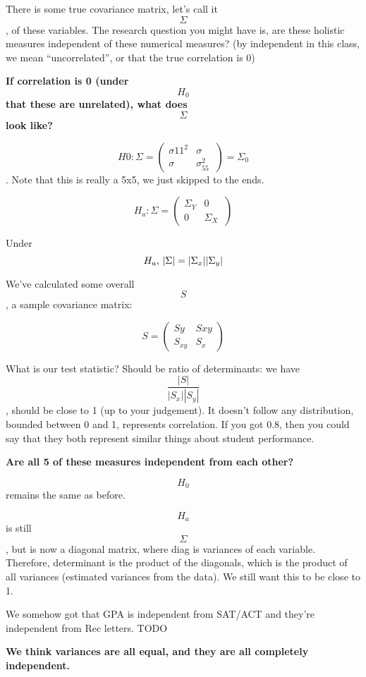 There is some true covariance matrix, let's call it \[\Sigma\], of these
variables. The research question you might have is, are these holistic
measures independent of these numerical measures? (by independent in
this class, we mean ``uncorrelated'', or that the true correlation is 0)

\textbf{If correlation is 0 (under} \[H_0\] \textbf{that these are
unrelated), what does} \[\Sigma\] \textbf{look like?}

\[H0: \Sigma = \left(\begin{array}{c} \sigma{11}^2 & \sigma \\ \sigma & \sigma_{55}^2 \ \end{array} \right) = \Sigma_0\].
Note that this is really a 5x5, we just skipped to the ends.

\[H_a: \Sigma = \left(\begin{array}{c} \Sigma_Y & 0 \\ 0 & \Sigma_X \ \end{array} \right)\]

Under \[H_a$, $| \Sigma | = | \Sigma_x | | \Sigma_y |\]

We've calculated some overall \[S\], a sample covariance matrix:

\[S = \left(\begin{array}{c} Sy & S{xy} \\ S_{xy} & S_x \ \end{array} \right)\]

What is our test statistic? Should be ratio of determinants: we have
\[\frac{| S |}{| S_x | |S_y|}\], should be close to 1 (up to your
judgement). It doesn't follow any distribution, bounded between 0 and 1,
represents correlation. If you got 0.8, then you could say that they
both represent similar things about student performance.

\textbf{Are all 5 of these measures independent from each other?}

\[H_0\] remains the same as before.

\[H_a\] is still \[\Sigma\], but is now a diagonal matrix, where diag is
variances of each variable. Therefore, determinant is the product of the
diagonals, which is the product of all variances (estimated variances
from the data). We still want this to be close to 1.

We somehow got that GPA is independent from SAT/ACT and they're
independent from Rec letters. TODO

\textbf{We think variances are all equal, and they are all completely
independent.}

